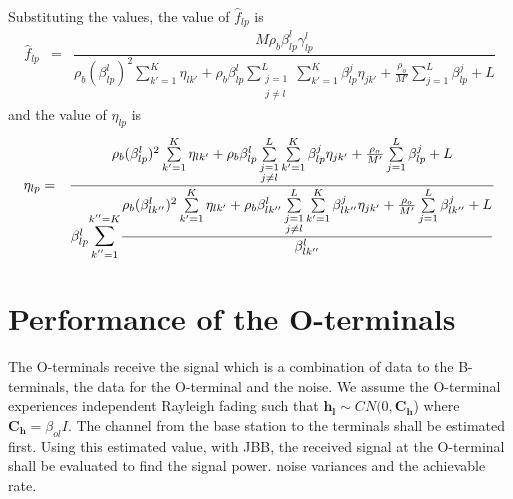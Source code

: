 \documentclass[10pt, a4paper, twoside,fleqn]{article}
\begin{document}
Substituting the values, the value of $\hat f_{lp}$ is
\begin{eqnarray}
	\hat f_{lp} &=& \dfrac{M\rho_b\beta_{lp}^{l}\gamma_{lp}^{l}}
                            {\rho_b(\beta_{lp}^{l})^2\sum\limits_{k' = 1}^{K}\eta_{lk'}
                            +\rho_b\beta_{lp}^{l} \sum\limits_{\substack{j=1 \\ j \neq l}}^{L} \sum\limits_{k' = 1}^{K}\beta^{j}_{lp}\eta_{jk'}
		  	    +\frac{\rho_o}{M'} \sum\limits_{j=1}^{L}\beta_{lp}^{j}
						   +L}
\end{eqnarray}
and the value of $\eta_{lp}$ is
\begin{eqnarray}
	\eta_{lp} &=&  \dfrac{\rho_b(\beta_{lp}^{l})^2\sum\limits_{k' = 1}^{K}\eta_{lk'}
                            +\rho_b\beta_{lp}^{l} \sum\limits_{\substack{j=1 \\ j \neq l}}^{L} \sum\limits_{k' = 1}^{K}\beta^{j}_{lp}\eta_{jk'}
		  	    +\frac{\rho_o}{M'} \sum\limits_{j=1}^{L}\beta_{lp}^{j}+L}
			     {\beta_{lp}^{l}\mathlarger{\mathlarger{\sum}}\limits_{k''=1}^{k''=K}\dfrac{
                            \rho_b(\beta_{lk''}^{l})^2\sum\limits_{k' = 1}^{K}\eta_{lk'}
                            +\rho_b\beta_{lk''}^{l} \sum\limits_{\substack{j=1 \\ j \neq l}}^{L} \sum\limits_{k' = 1}^{K}\beta^{j}_{lk''}\eta_{jk'}
		  	    +\frac{\rho_o}{M'} \sum\limits_{j=1}^{L}\beta_{lk''}^{j}
						   +L}{\beta_{lk''}^{l}}}
\end{eqnarray}

\section{Performance of the O-terminals}
	The O-terminals receive the signal which is a combination of data to the B-terminals, the data for the O-terminal and the noise. We assume the O-terminal experiences independent Rayleigh fading such that $\pmb{h_{l}} \sim CN(0,\pmb{C_h}$) where $\pmb{C_h} = \beta_{ol}I$. The channel from the base station to the terminals shall be estimated first. Using this estimated value, with JBB, the received signal at the O-terminal shall be evaluated to find the signal power. noise variances and the achievable rate.
\end{document}

